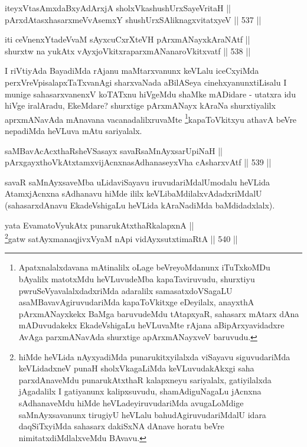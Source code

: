 
\begin{shl}
iteyxVtasAmxdaBxyAdArxjA sholxVkashushUrxSayeVritaH || \\
pArxdAtasxhasarxmeVvAsemxY shushUrxSAliknagxvitatxyeV \hfill || 537 ||  
\end{shl}

\begin{shl}
iti ceVnenxYtadeVvaM sAyxcuCxrXteVH pArxmANayxkAraNAtf || \\
shurxtw na yukAtx vAyxjoVkitxraparxmANanaroVkitxvatf \hfill || 538 ||  
\end{shl}

\begin{artha}
I riVtiyAda BayadiMda rAjanu maMtarxvanunx keVLalu iceCxyiMda
perxVreVpisalapxTaTxvanAgi sharxvaNada aBilASeya cinehxyanunx\break tiLisalu
I munige sahasarxvanenxV koTATxnu hiVgeMdu shaMke mADidare - utatxra
idu hiVge iralAradu, EkeMdare? shurxtige pArxmANayx kAraNa
shurxtiyalilx aprxmANavAda mAnavana vacanadalilxruvaMte \footnote{Apatxnalalxdavana mAtinalilx oLage
beVreyoMdanunx iTuTxkoMDu bAyalilx matotxMdu heVLuvudeMba
kapaTaviruvudu, shurxtiyu pwruSeVyavalalxdadxriMda adaralilx
samasatxdoVSagaLU asaMBavavAgiruvudariMda kapaToVkitxge eDeyilalx,
anayxthA pArxmANayxkekx BaMga baruvudeMdu tAtapxyaR, sahasarx mAtarx
dAna mADuvudakekx EkadeVshigaLu heVLuvaMte rAjana aBipArxyavidadxre
AvAga parxmANavAda shurxtige apArxmANayxveV baruvudu.}kapaToVkitxyu athavA beVre nepadiMda
heVLuva mAtu sariyalalx.
\end{artha}


\begin{shl}
saMBavAcAcxthaRsheVSasayx savaRsaMnAyxsarUpiNaH || \\
pArxgayxthoVkAtxtamxvijAcnxnasAdhanaseyxVha cAsharxvAtf \hfill || 539 ||  
\end{shl}

\begin{artha}
savaR saMnAyxsaveMba uLidaviSayavu iruvudariMdalU\break modalu heVLida
AtamxjAcnxna sAdhanavu hiMde ililx keVLibaMdilalxvAdadxriMdalU
(sahasarxdAnavu EkadeVshigaLu heVLida kAraNadiMda baMdidadxlalx).
\end{artha}

\begin{shl}
yata EvamatoV\s yukAtx punarukAtxthaRkalapxnA || \\
\footnote{hiMde heVLida nAyxyadiMda punarukitxyilalxda viSayavu siguvudariMda keVLidadxneV punaH sholxVkagaLiMda keVLuvudakAkxgi saha parxdAnaveMdu punarukAtxthaR kalapxneyu sariyalalx, gatiyilalxda jAgadalilx I gatiyanunx kalipxsuvudu, shamAdiguNagaLu jAcnxna sAdhanaveMdu hiMde heVLadeyiruvudariMda avugaLoMdige saMnAyxsavanunx tirugiyU heVLalu bahudAgiruvudariMdalU idara daqSiTxyiMda sahasarx dakiSxNA dAnave horatu beVre nimitatxdiMdlalxveMdu BAvavu.}gatw satAyxmanaqjivxVyaM nApi vidAyxsutxtimaRtA \hfill || 540 ||  
\end{shl}


